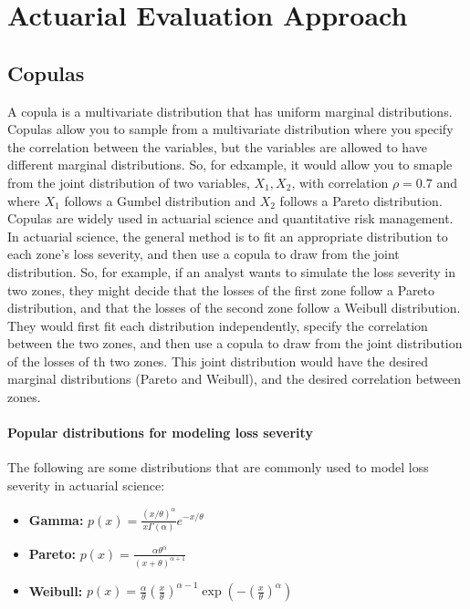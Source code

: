 \documentclass[11pt]{article}
\begin{document}
\section{Actuarial Evaluation Approach}
  \subsection{Copulas}
    A copula is a multivariate distribution that has uniform marginal distributions. Copulas allow you to sample from a multivariate distribution where you specify the correlation between the variables, but the variables are allowed to have different marginal distributions. So, for edxample, it would allow you to smaple from the joint distribution of two variables, $X_1, X_2$, with correlation $\rho=0.7$ and where $X_1$ follows a Gumbel distribution and $X_2$ follows a Pareto distribution. \\
    Copulas are widely used in actuarial science and quantitative risk management. In actuarial science, the general method is to fit an appropriate distribution to each zone's loss severity, and then use a copula to draw from the joint distribution. So, for example, if an analyst wants to simulate the loss severity in two zones, they might decide that the losses of the first zone follow a Pareto distribution, and that the losses of the second zone follow a Weibull distribution. They would first fit each distribution independently, specify the correlation between the two zones, and then use a copula to draw from the joint distribution of the losses of th two zones. This joint distribution would have the desired marginal distributions (Pareto and Weibull), and the desired correlation between zones. 
    \paragraph{Popular distributions for modeling loss severity} The following are some distributions that are commonly used to model loss severity in actuarial science: 
    \begin{itemize}
        \item \textbf{Gamma:} $p(x) = \frac{(x/\theta)^{\alpha}}{x\Gamma(\alpha)}e^{-x/\theta}$
        \item \textbf{Pareto:} $p(x) = \frac{\alpha \theta^{\alpha}}{(x+\theta)^{\alpha + 1}}$
        \item \textbf{Weibull:} $p(x) = \frac{\alpha}{\theta} \left ( \frac{x}{\theta} \right )^{\alpha -1} \exp \left (-\left (\frac{x}{\theta}\right )^{\alpha}\right )$
    \end{itemize}
\end{document}
